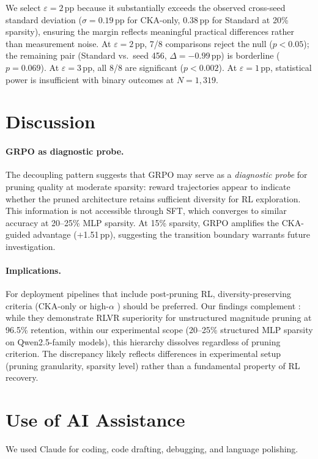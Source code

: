 We select $\varepsilon{=}2$\,pp because it substantially exceeds the observed cross-seed standard deviation ($\sigma{=}0.19$\,pp for CKA-only, $0.38$\,pp for Standard at 20\% sparsity), ensuring the margin reflects meaningful practical differences rather than measurement noise.
At $\varepsilon{=}2$\,pp, 7/8 comparisons reject the null ($p{<}0.05$); the remaining pair (Standard vs.\ seed 456, $\Delta{=}{-}0.99$\,pp) is borderline ($p{=}0.069$).
At $\varepsilon{=}3$\,pp, all 8/8 are significant ($p{<}0.002$).
At $\varepsilon{=}1$\,pp, statistical power is insufficient with binary outcomes at $N{=}1{,}319$.

\section{Discussion}
\label{sec:appendix_discussion}

\paragraph{GRPO as diagnostic probe.}
The decoupling pattern suggests that GRPO may serve as a \emph{diagnostic probe} for pruning quality at moderate sparsity: reward trajectories appear to indicate whether the pruned architecture retains sufficient diversity for RL exploration. This information is not accessible through SFT, which converges to similar accuracy at 20--25\% MLP sparsity.
At 15\% sparsity, GRPO amplifies the CKA-guided advantage ($+$1.51\,pp), suggesting the transition boundary warrants future investigation.

\paragraph{Implications.}
For deployment pipelines that include post-pruning RL, diversity-preserving criteria (CKA-only or high-$\alpha$ \rasp{}) should be preferred.
Our findings complement \citet{selfhealing2025}: while they demonstrate RLVR superiority for unstructured magnitude pruning at 96.5\% retention, within our experimental scope (20--25\% structured MLP sparsity on Qwen2.5-family models), this hierarchy dissolves regardless of pruning criterion. The discrepancy likely reflects differences in experimental setup (pruning granularity, sparsity level) rather than a fundamental property of RL recovery.

\section{Use of AI Assistance}
\label{sec:appendix_ai_assistants}

We used Claude for coding, code drafting, debugging, and language polishing.
